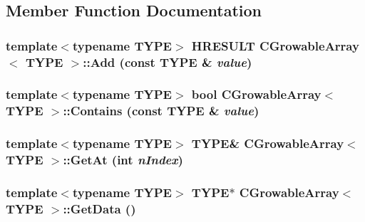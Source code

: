 \subsection{Member Function Documentation}
\hypertarget{class_c_growable_array_a63527f5abc32e76867278928eee2e32b}{
\subsubsection[{Add}]{\setlength{\rightskip}{0pt plus 5cm}template$<$typename TYPE$>$ HRESULT {\bf CGrowableArray}$<$ TYPE $>$::Add (const TYPE \& {\em value})}}
\label{class_c_growable_array_a63527f5abc32e76867278928eee2e32b}
\hypertarget{class_c_growable_array_a0b48a56bedc0c6e00e7eede32d29e752}{
\subsubsection[{Contains}]{\setlength{\rightskip}{0pt plus 5cm}template$<$typename TYPE$>$ bool {\bf CGrowableArray}$<$ TYPE $>$::Contains (const TYPE \& {\em value})}}
\label{class_c_growable_array_a0b48a56bedc0c6e00e7eede32d29e752}
\hypertarget{class_c_growable_array_ac9d62b83d40b9a8f974ae0e47d108e42}{
\subsubsection[{GetAt}]{\setlength{\rightskip}{0pt plus 5cm}template$<$typename TYPE$>$ TYPE\& {\bf CGrowableArray}$<$ TYPE $>$::GetAt ({\bf int} {\em nIndex})}}
\label{class_c_growable_array_ac9d62b83d40b9a8f974ae0e47d108e42}
\hypertarget{class_c_growable_array_ab3d75c2f7eca8b3c49f63932bd8ae5bb}{
\subsubsection[{GetData}]{\setlength{\rightskip}{0pt plus 5cm}template$<$typename TYPE$>$ TYPE$\ast$ {\bf CGrowableArray}$<$ TYPE $>$::GetData ()}}
